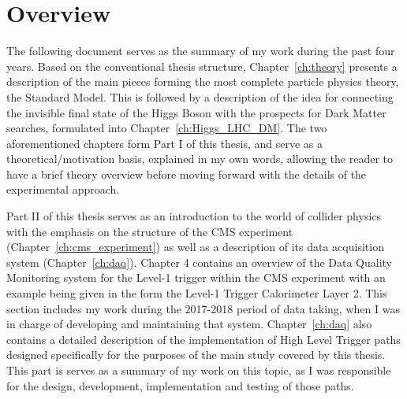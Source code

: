 \setcounter{chapter}{-1}
\chapter{Overview}
\mediumlinespacing
\hspace{10pt} The following document serves as the summary of my work during the past four years. Based on the conventional thesis structure, Chapter~\ref{ch:theory} presents a description of the main pieces forming the most complete particle physics theory, the Standard Model. This is  followed by a description of the idea for connecting the invisible final state of the Higgs Boson with the prospects for Dark Matter searches, formulated into Chapter~\ref{ch:Higgs_LHC_DM}. The two aforementioned chapters form Part I of this thesis, and serve as a theoretical/motivation basis, explained in my own words, allowing the reader to have a brief theory overview before moving forward with the details of the experimental approach. 

\hspace{10pt} Part II of this thesis serves as an introduction to the world of collider physics with the emphasis on the structure of the CMS experiment (Chapter~\ref{ch:cms_experiment}) as well as a description of its data acquisition system (Chapter~\ref{ch:daq}). Chapter 4 contains an overview of the Data Quality Monitoring system for the Level-1 trigger within the CMS experiment with an example being given in the form the Level-1 Trigger Calorimeter Layer 2. This section includes my work during the 2017-2018 period of data taking, when I was in charge of developing and maintaining that system. Chapter~\ref{ch:daq} also contains a detailed description of the implementation of High Level Trigger paths designed specifically for the purposes of the main study covered by this thesis. This part is serves as a summary of my work on this topic, as I was responsible for the design, development, implementation and testing of those paths.

